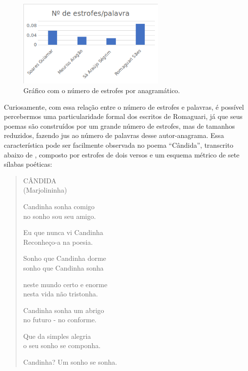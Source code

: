 \documentclass[portuguese]{textolivre}
\begin{document}
\begin{figure}[h!]
 \centering
 \includegraphics[width=0.65\textwidth]{fig-002.png}
 \caption{Gráfico com o número de estrofes por anagramático.}
 \label{fig02}
\end{figure}

Curiosamente, com essa relação entre o número de estrofes e palavras, é possível percebermos uma particularidade formal dos escritos de Romaguari, já que seus poemas são construídos por um grande número de estrofes, mas de tamanhos reduzidos, fazendo jus ao número de palavras desse autor-anagrama. Essa característica pode ser facilmente observada no poema “Cândida”, transcrito abaixo de \textcite[p. 235]{rosa_ave_1985}, composto por estrofes de dois versos e um esquema métrico de sete sílabas poéticas:

\begin{quote}
CÂNDIDA\\
(Marjolininha)

Candinha sonha comigo\\
no sonho sou seu amigo.

Eu que nunca vi Candinha\\
Reconheço-a na poesia.

Sonho que Candinha dorme\\
sonho que Candinha sonha

neste mundo certo e enorme\\
nesta vida não tristonha.

Candinha sonha um abrigo\\
no futuro - no conforme.

Que da simples alegria\\
o seu sonho se componha.

Candinha? Um sonho se sonha.
\end{quote}
\end{document}
